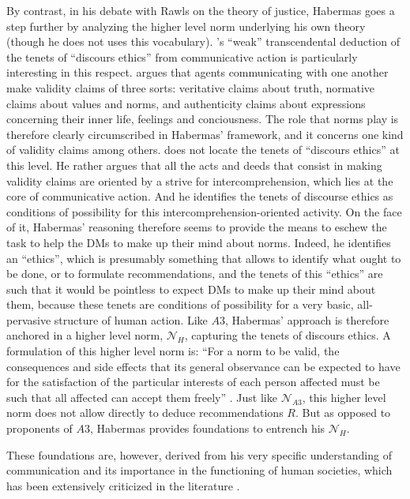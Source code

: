 \documentclass[preprint, french, english, 11pt, authoryear]{elsarticle}%
\begin{document}
By contrast, in his debate with Rawls on the theory of justice, Habermas goes a step further by analyzing the higher level norm underlying his own theory (though he does not uses this vocabulary). \cite{habermas_moralbewustsein_1983}'s “weak” transcendental deduction of the tenets of “discours ethics” from communicative action is particularly interesting in this respect. \citet{habermas_theorie_1981} argues that agents communicating with one another make validity claims of three sorts: veritative claims about truth, normative claims about values and norms, and authenticity claims about expressions concerning their inner life, feelings and conciousness. The role that norms play is therefore clearly circumscribed in Habermas' framework, and it concerns one kind of validity claims among others. \cite{habermas_moralbewustsein_1983} does not locate the tenets of “discours ethics” at this level. He rather argues that all the acts and deeds that consist in making validity claims are oriented by a strive for intercomprehension, which lies at the core of communicative action. And he identifies the tenets of discourse ethics as conditions of possibility for this intercomprehension-oriented activity. On the face of it, Habermas' reasoning therefore seems to provide the means to eschew the task to help the \acp{DM} to make up their mind about norms. Indeed, he identifies an “ethics”, which is presumably something that allows to identify what ought to be done, or to formulate recommendations, and the tenets of this “ethics” are such that it would be pointless to expect \acp{DM} to make up their mind about them, because these tenets are conditions of possibility for a very basic, all-pervasive structure of human action. Like $A3$, Habermas' approach is therefore anchored in a higher level norm, $\mathscr{N}_{H}$, capturing the tenets of discours ethics. A formulation of this higher level norm is: “For a norm to be valid, the consequences and side effects that its general observance can be expected to have for the satisfaction of the particular interests of each person affected must be such that all affected can accept them freely” \citep{habermas_moralbewustsein_1983}. Just like $\mathscr{N}_{A3}$, this higher level norm does not allow directly to deduce recommendations $R$. But as opposed to proponents of $A3$, Habermas provides foundations to entrench his $\mathscr{N}_{H}$. 

These foundations are, however, derived from his very specific understanding of communication and its importance in the functioning of human societies, which has been extensively criticized in the literature \citep{heath_communicative_2001,honneth_kritik_1985}. 
\end{document}
